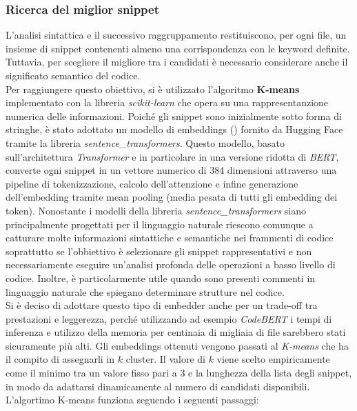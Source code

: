\documentclass{article}
\begin{document}
\subsubsection{Ricerca del miglior snippet}
L'analisi sintattica e il successivo raggruppamento restituiscono, per ogni file, un insieme di snippet contenenti almeno una corrispondenza con le keyword definite. Tuttavia, per scegliere il migliore tra i candidati è necessario considerare anche il significato semantico del codice.\\
Per raggiungere questo obiettivo, si è utilizzato l'algoritmo \textbf{K-means} implementato con la libreria \textit{scikit-learn}\cite{scikit-learn} che opera su una rappresentanzione numerica delle informazioni. Poiché gli snippet sono inizialmente sotto forma di stringhe, è stato adottato un modello di embeddings (\cite{all-MiniLM-L6-v2}) fornito da Hugging Face tramite la libreria \textit{sentence\_transformers}. Questo modello, basato sull’architettura \textit{Transformer} e in particolare in una versione ridotta di \textit{BERT}, converte ogni snippet in un vettore numerico di 384 dimensioni attraverso una pipeline di tokenizzazione, calcolo dell’attenzione e infine generazione dell’embedding tramite mean pooling (media pesata di tutti gli embedding dei token). Nonostante i modelli della libreria \textit{sentence\_transformers} siano principalmente progettati per il linguaggio naturale riescono comunque a catturare molte informazioni sintattiche e semantiche nei frammenti di codice soprattutto se l'obbiettivo è selezionare gli snippet rappresentativi e non necessariamente eseguire un'analisi profonda delle operazioni a basso livello di codice. Inoltre, è particolarmente utile quando sono presenti commenti in linguaggio naturale che spiegano determinare strutture nel codice.\\ 
Si è deciso di adottare questo tipo di embedder anche per un trade-off tra prestazioni e leggerezza, perché utilizzando ad esempio \textit{CodeBERT}\cite{feng2020codebertpretrainedmodelprogramming} i tempi di inferenza e utilizzo della memoria per centinaia di migliaia di file sarebbero stati sicuramente più alti. 
Gli embeddings ottenuti vengono passati al \textit{K-means} che ha il compito di assegnarli in $k$ cluster. Il valore di $k$ viene scelto empiricamente come il minimo tra un valore fisso pari a 3 e la lunghezza della lista degli snippet, in modo da adattarsi dinamicamente al numero di candidati disponibili.\\
L'algortimo K-means funziona seguendo i seguenti passaggi:
\end{document}
